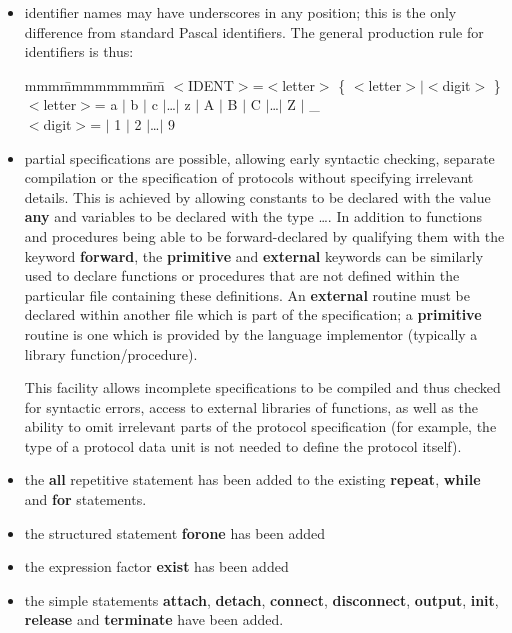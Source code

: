 \begin{itemize}
\item identifier names may have underscores in any position;
this is the only difference from standard Pascal
identifiers. The general production rule for identifiers
is thus:

\begin{tabbing}
mmm\=mmmmmmm\=mm\=\+\kill
$<$IDENT$>$\>=\>$<$letter$>$ \{ $<$letter$>|<$digit$>$ \}\\
$<$letter$>$\>=\> a $|$ b $|$ c $|$\dots$|$ z $|$ A $|$ B $|$ C $|$\dots$|$ Z $|$ \_\\
$<$digit$>$\>= $|$ 1 $|$ 2 $|$\dots$|$ 9
\end{tabbing}

\item partial specifications are possible, allowing early
syntactic checking, separate compilation or the 
specification of protocols without specifying irrelevant details.
This is achieved by allowing constants to be declared with the 
value {\bf any} and variables to be declared with the type 
\dots. In addition to functions and procedures being able to be
forward-declared by qualifying them with the keyword {\bf forward},
the {\bf primitive} and {\bf external} keywords can be similarly
used to declare functions or procedures that are not defined 
within the particular file containing these definitions. An {\bf
external} routine must be declared within another file which is part
of the specification; a {\bf primitive} routine is one which is
provided by the language implementor (typically a library
function/procedure). 

This facility allows incomplete specifications to
be compiled and thus checked for syntactic errors,
access to external libraries of functions, as well as
the ability to omit irrelevant parts of the protocol
specification (for example, the type of a protocol
data unit is not needed to define the protocol
itself).

\item the {\bf all} repetitive statement has been added to the
existing {\bf repeat}, {\bf while} and {\bf for} statements.

\item the structured statement {\bf forone} has been added

\item the expression factor {\bf exist} has been added

\item the simple statements {\bf attach}, {\bf detach}, 
{\bf connect}, {\bf disconnect}, {\bf output}, {\bf init},
{\bf release} and {\bf terminate} have been added.
\end{itemize}

